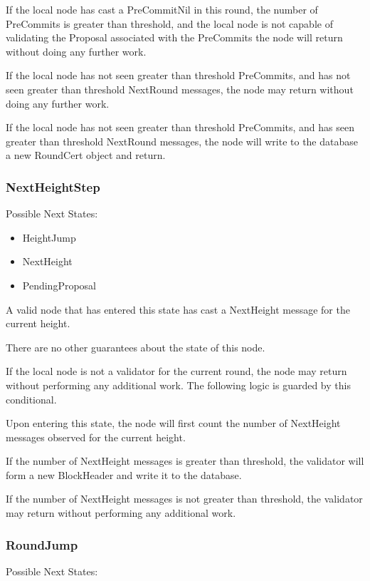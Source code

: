 If the local node has cast a PreCommitNil in this round, the number of
PreCommits is greater than threshold, and the local node is not capable
of validating the Proposal associated with the PreCommits the node will
return without doing any further work.

If the local node has not seen greater than threshold PreCommits, and
has not seen greater than threshold NextRound messages, the node may
return without doing any further work.

If the local node has not seen greater than threshold PreCommits, and
has seen greater than threshold NextRound messages, the node will write
to the database a new RoundCert object and return.


\subsubsection{NextHeightStep}

Possible Next States:

\begin{itemize}
    \item HeightJump
    \item NextHeight
    \item PendingProposal
\end{itemize}

A valid node that has entered this state has cast a NextHeight message
for the current height.

There are no other guarantees about the state of this node.

If the local node is not a validator for the current round, the node
may return without performing any additional work.
The following logic is guarded by this conditional.

Upon entering this state, the node will first count the number of
NextHeight messages observed for the current height.

If the number of NextHeight messages is greater than threshold, the
validator will form a new BlockHeader and write it to the database.

If the number of NextHeight messages is not greater than threshold, the
validator may return without performing any additional work.


\subsubsection{RoundJump}

Possible Next States:

